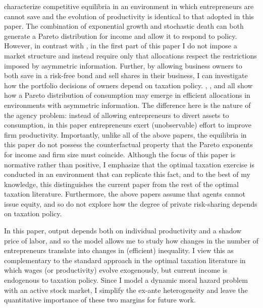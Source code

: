 \documentclass[11pt]{article}
\theoremstyle{plain}
\begin{document}
\cite{jones_schumpeterian_2018} characterize competitive equilibria in an environment in which entrepreneurs are cannot save and the evolution of productivity is identical to that adopted in this paper. The combination of exponential growth and stochastic death can both generate a Pareto distribution for income and allow it to respond to policy. However, in contrast with \cite{jones_schumpeterian_2018}, in the first part of this paper I do not impose a market structure and instead require only that allocations respect the restrictions imposed by asymmetric information. Further, by allowing business owners to both save in a risk-free bond and sell shares in their business, I can investigate how the portfolio decisions of owners depend on taxation policy. \cite{ai_quantitative_2022}, \cite{shourideh_optimal_2013}, and \cite{phelan_optimality_2022} all show how a Pareto distribution of consumption may emerge in efficient allocations in environments with asymmetric information. The difference here is the nature of the agency problem: instead of allowing entrepreneurs to divert assets to consumption, in this paper entrepreneurs exert (unobservable) effort to improve firm productivity. Importantly, unlike all of the above papers, the equilibria in this paper do not possess the counterfactual property that the Pareto exponents for income and firm size must coincide. Although the focus of this paper is normative rather than positive, I emphasize that the optimal taxation exercise is conducted in an environment that can replicate this fact, and to the best of my knowledge, this distinguishes the current paper from the rest of the optimal taxation literature. Furthermore, the above papers assume that agents cannot issue equity, and so do not explore how the degree of private risk-sharing depends on taxation policy. 


In this paper, output depends both on individual productivity and a shadow price of labor, and so the model allows me to study how changes in the number of entrepreneurs translate into changes in (efficient) inequality. I view this as complementary to the standard approach in the optimal taxation literature in which wages (or productivity) evolve exogenously, but current income is endogenous to taxation policy. Since I model a dynamic moral hazard problem with an active stock market, I simplify the ex-ante heterogeneity and leave the quantitative importance of these two margins for future work. 

\end{document}
